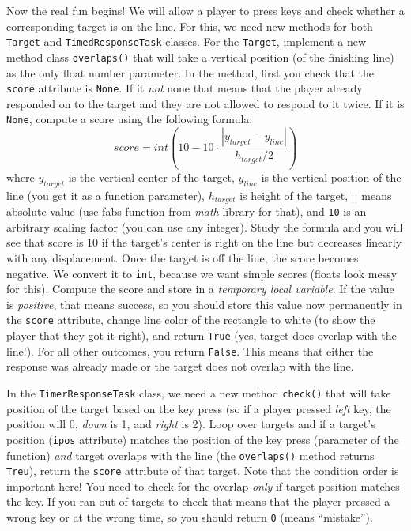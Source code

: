 \documentclass[
]{book}
\begin{document}
Now the real fun begins! We will allow a player to press keys and check whether a corresponding target is on the line. For this, we need new methods for both \texttt{Target} and \texttt{TimedResponseTask} classes. For the \texttt{Target}, implement a new method class \texttt{overlaps()} that will take a vertical position (of the finishing line) as the only float number parameter. In the method, first you check that the \texttt{score} attribute is \texttt{None}. If it \emph{not} none that means that the player already responded on to the target and they are not allowed to respond to it twice. If it is \texttt{None}, compute a score using the following formula:
\[score = int \left(10 - 10 \cdot \frac{|y_{target} - y_{line}|}{h_{target} / 2} \right)\]
where \(y_{target}\) is the vertical center of the target, \(y_{line}\) is the vertical position of the line (you get it as a function parameter), \(h_{target}\) is height of the target, \(||\) means absolute value (use \href{https://docs.python.org/3/library/math.html\#math.fabs}{fabs} function from \emph{math} library for that), and \texttt{10} is an arbitrary scaling factor (you can use any integer). Study the formula and you will see that score is 10 if the target's center is right on the line but decreases linearly with any displacement. Once the target is off the line, the score becomes negative. We convert it to \texttt{int}, because we want simple scores (floats look messy for this). Compute the score and store in a \emph{temporary local variable}. If the value is \emph{positive}, that means success, so you should store this value now permanently in the \texttt{score} attribute, change line color of the rectangle to white (to show the player that they got it right), and return \texttt{True} (yes, target does overlap with the line!). For all other outcomes, you return \texttt{False}. This means that either the response was already made or the target does not overlap with the line.

In the \texttt{TimerResponseTask} class, we need a new method \texttt{check()} that will take position of the target based on the key press (so if a player pressed \emph{left} key, the position will 0, \emph{down} is 1, and \emph{right} is 2). Loop over targets and if a target's position (\texttt{ipos} attribute) matches the position of the key press (parameter of the function) \emph{and} target overlaps with the line (the \texttt{overlaps()} method returns \texttt{Treu}), return the \texttt{score} attribute of that target. Note that the condition order is important here! You need to check for the overlap \emph{only} if target position matches the key. If you ran out of targets to check that means that the player pressed a wrong key or at the wrong time, so you should return \texttt{0} (means ``mistake'').
\end{document}
